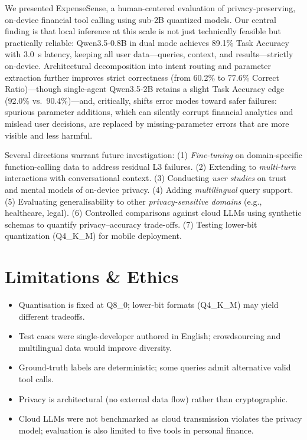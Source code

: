 \documentclass[11pt,twocolumn]{article}
\begin{document}
We presented ExpenseSense, a human-centered evaluation of
privacy-preserving, on-device financial tool calling using sub-2B
quantized models.
Our central finding is that local inference at this scale is not just
technically feasible but practically reliable: Qwen3.5-0.8B in dual
mode achieves 89.1\% Task Accuracy with 3.0~s latency, keeping all
user data---queries, context, and results---strictly on-device.
Architectural decomposition into intent routing and parameter
extraction further improves strict correctness (from 60.2\% to 77.6\%
Correct Ratio)---though single-agent Qwen3.5-2B retains a slight
Task Accuracy edge (92.0\% vs.\ 90.4\%)---and, critically, shifts
error modes toward safer failures: spurious parameter additions,
which can silently corrupt financial analytics and mislead user
decisions, are replaced by missing-parameter errors that are more
visible and less harmful.

Several directions warrant future investigation:
(1) \emph{Fine-tuning} on domain-specific function-calling data to address residual L3 failures.
(2) Extending to \emph{multi-turn} interactions with conversational context.
(3) Conducting \emph{user studies} on trust and mental models of on-device privacy.
(4) Adding \emph{multilingual} query support.
(5) Evaluating generalisability to other \emph{privacy-sensitive domains} (e.g., healthcare, legal).
(6) Controlled comparisons against cloud LLMs using synthetic schemas to quantify privacy--accuracy trade-offs.
(7) Testing lower-bit quantization (Q4\_K\_M) for mobile deployment.

\vspace{-5pt}
\section*{Limitations \& Ethics}
\vspace{-3pt}

\begin{itemize}\itemsep=0pt \parskip=0pt \parsep=0pt
    \item Quantisation is fixed at Q8\_0; lower-bit formats (Q4\_K\_M) may yield different tradeoffs.
    \item Test cases were single-developer authored in English; crowdsourcing and multilingual data would improve diversity.
    \item Ground-truth labels are deterministic; some queries admit alternative valid tool calls.
    \item Privacy is architectural (no external data flow) rather than cryptographic.
    \item Cloud LLMs were not benchmarked as cloud transmission violates the privacy model; evaluation is also limited to five tools in personal finance.
\end{itemize}
\end{document}
